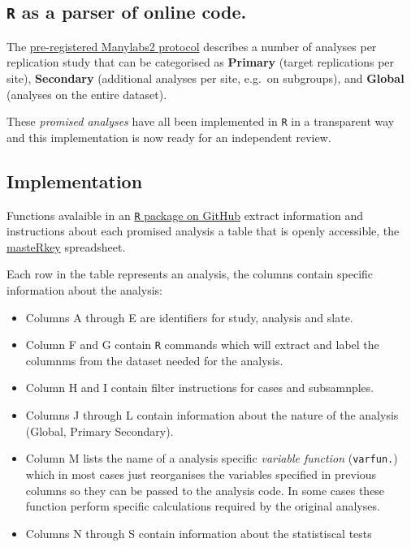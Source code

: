 \documentclass[]{article}
\begin{document}
\subsection{\texttt{R} as a parser of online
code.}\label{r-as-a-parser-of-online-code.}

The
\href{https://docs.google.com/document/d/1B5sVz3jlKMGnpxik-cfCeR8ngeQ249bzQExaVd5FzZM/edit}{pre-registered
Manylabs2 protocol} describes a number of analyses per replication study
that can be categorised as \textbf{Primary} (target replications per
site), \textbf{Secondary} (additional analyses per site, e.g.~on
subgroups), and \textbf{Global} (analyses on the entire dataset).

These \emph{promised analyses} have all been implemented in \texttt{R}
in a transparent way and this implementation is now ready for an
independent review.

\subsection{Implementation}\label{implementation}

Functions avalaible in an
\href{https://github.com/FredHasselman/ManyLabRs/tree/master/manylabRs}{\texttt{R}
package on GitHub} extract information and instructions about each
promised analysis a table that is openly accessible, the
\href{https://docs.google.com/spreadsheets/d/1fqK3WHwFPMIjNVVvmxpMEjzUETftq_DmP5LzEhXxUHA/edit\#gid=769239110}{masteRkey}
spreadsheet.

Each row in the table represents an analysis, the columns contain
specific information about the analysis:

\begin{itemize}
\item
  Columns A through E are identifiers for study, analysis and slate.
\item
  Column F and G contain \texttt{R} commands which will extract and
  label the columnms from the dataset needed for the analysis.
\item
  Column H and I contain filter instructions for cases and subsamnples.
\item
  Columns J through L contain information about the nature of the
  analysis (Global, Primary Secondary).
\item
  Column M lists the name of a analysis specific \emph{variable
  function} (\texttt{varfun.}) which in most cases just reorganises the
  variables specified in previous columns so they can be passed to the
  analysis code. In some cases these function perform specific
  calculations required by the original analyses.
\item
  Columns N through S contain information about the statistiscal tests
\end{itemize}
\end{document}
